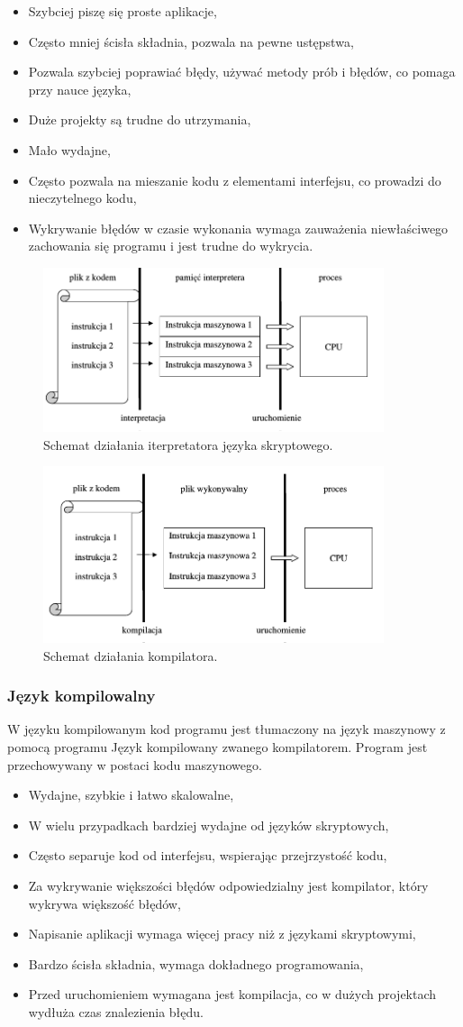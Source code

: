 \documentclass{mwart}
\newcommand*\tick{\item[\Checkmark]}
\newcommand*\fail{\item[\XSolidBrush]}
\begin{document}
\begin{itemize}
    \tick Szybciej piszę się proste aplikacje,
    \tick Często mniej ścisła składnia, pozwala na pewne ustępstwa,
    \tick Pozwala szybciej poprawiać błędy, używać metody prób i błędów,
    co pomaga przy nauce języka,
    \fail Duże projekty są trudne do utrzymania,
    \fail Mało wydajne,
    \fail Często pozwala na mieszanie kodu z elementami interfejsu, co prowadzi 
    do nieczytelnego kodu,
    \fail Wykrywanie błędów w czasie wykonania wymaga zauważenia niewłaściwego zachowania się
    programu i jest trudne do wykrycia.
\end{itemize}
\begin{center}
  \begin{figure}
    \includegraphics[width=10cm]{diag1}
    \caption{Schemat działania iterpretatora języka skryptowego.}
  \end{figure}
\end{center}
\begin{center}
  \begin{figure}
    \includegraphics[width=10cm]{diag2}
    \caption{Schemat działania kompilatora.}
  \end{figure}
\end{center}
\subsubsection{Język kompilowalny}
W języku kompilowanym kod programu jest tłumaczony na język maszynowy z pomocą programu
Język kompilowany
zwanego kompilatorem. Program jest przechowywany w postaci kodu maszynowego.
\begin{itemize}
    \tick Wydajne, szybkie i łatwo skalowalne,
    \tick W wielu przypadkach bardziej wydajne od języków skryptowych,
    \tick Często separuje kod od interfejsu, wspierając przejrzystość kodu,
    \tick Za wykrywanie większości błędów odpowiedzialny jest kompilator, który wykrywa
    większość błędów,
    \fail Napisanie aplikacji wymaga więcej pracy niż z językami skryptowymi,
    \fail Bardzo ścisła składnia, wymaga dokładnego programowania,
    \fail Przed uruchomieniem wymagana jest kompilacja, co w dużych projektach wydłuża czas
    znalezienia błędu.
\end{itemize}
\end{document}
